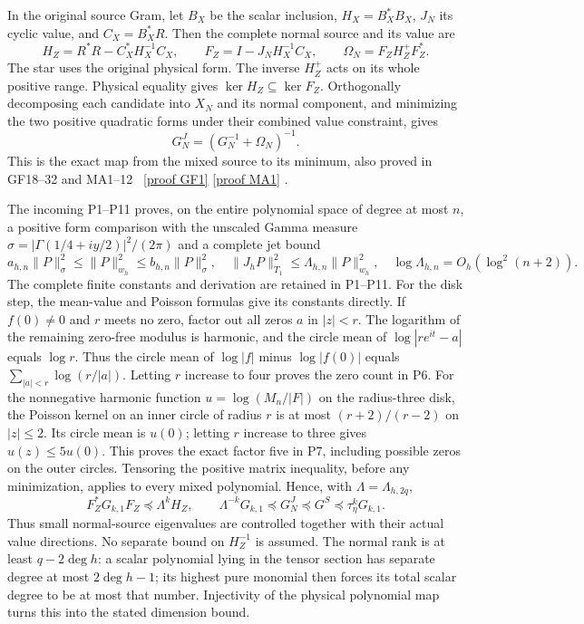 \documentclass[11pt]{article}
\begin{document}
In the original source Gram, let $B_X$ be the scalar inclusion,
$H_X=B_X^*B_X$, $J_N$ its cyclic value, and $C_X=B_X^*R$.
Then the complete normal source and its value are
\[
 H_Z=R^*R-C_X^*H_X^{-1}C_X,\qquad
 F_Z=I-J_NH_X^{-1}C_X,\qquad
 \Omega_N=F_ZH_Z^+F_Z^*.
 \tag{JM2}
\]
The star uses the original physical form. The inverse $H_Z^+$ acts on
its whole positive range. Physical equality gives
$\ker H_Z\subseteq\ker F_Z$. Orthogonally decomposing each candidate
into $X_N$ and its normal component, and minimizing the two positive
quadratic forms under their combined value constraint, gives
\[
 G_N^J=(G_N^{-1}+\Omega_N)^{-1}.\tag{JM3}
\]
This is the exact map from the mixed source to its minimum, also proved
in GF18--32 and MA1--12 \cite{GF,MA}%
~\href{https://github.com/KokunoYumeto/zeta-function-research-reader/blob/main/workbenches/splitzero-tandem/continuations/20260921-kernel-degree-steps/providers/OBSERVATION_COMPLETE_PROOFS.tex\#L1108}{[proof GF1]} \href{https://github.com/KokunoYumeto/zeta-function-research-reader/blob/main/workbenches/splitzero-tandem/continuations/20260921-kernel-degree-steps/providers/OBSERVATION_COMPLETE_PROOFS.tex\#L1893}{[proof MA1]}%
{}.

The incoming P1--P11 proves, on the entire polynomial space of degree
at most $n$, a positive form comparison with the unscaled Gamma
measure $\sigma=|\Gamma(1/4+iy/2)|^2/(2\pi)$ and a complete jet bound
\[
 a_{h,n}\|P\|_\sigma^2\le\|P\|_{w_h}^2\le b_{h,n}\|P\|_\sigma^2,
 \quad \|J_hP\|_{T_1}^2\le\Lambda_{h,n}\|P\|_{w_h}^2,
 \quad\log\Lambda_{h,n}=O_h(\log^2(n+2)).\tag{JM4}
\]
The complete finite constants and derivation are retained in P1--P11.
For the disk step, the mean-value and Poisson formulas
\cite{Complex} give its constants directly. If $f(0)\ne0$ and
$r$ meets no zero, factor out all zeros $a$ in $|z|<r$.
The logarithm of the remaining zero-free modulus is harmonic, and
the circle mean of $\log|re^{it}-a|$ equals $\log r$.
Thus the circle mean of $\log|f|$ minus $\log|f(0)|$ equals
$\sum_{|a|<r}\log(r/|a|)$. Letting $r$ increase to four proves
the zero count in P6. For the nonnegative harmonic function
$u=\log(M_n/|F|)$ on the radius-three disk, the Poisson kernel on
an inner circle of radius $r$ is at most $(r+2)/(r-2)$ on
$|z|\le2$. Its circle mean is $u(0)$; letting $r$ increase to
three gives $u(z)\le5u(0)$. This proves the exact factor five
in P7, including possible zeros on the outer circles.
Tensoring the positive matrix inequality, before any minimization,
applies to every mixed polynomial. Hence, with $\Lambda=\Lambda_{h,2q}$,
\[
 F_Z^*G_{k,1}F_Z\preceq\Lambda^kH_Z,\qquad
 \Lambda^{-k}G_{k,1}\preceq G_N^J
 \preceq G^S\preceq\tau_\eta^kG_{k,1}.\tag{JM5}
\]
Thus small normal-source eigenvalues are controlled together with
their actual value directions. No separate bound on $H_Z^{-1}$ is
assumed. The normal rank is at least $q-2\deg h$: a scalar polynomial
lying in the tensor section has separate degree at most $2\deg h-1$;
its highest pure monomial then forces its total scalar degree to be
at most that number. Injectivity of the physical polynomial map
turns this into the stated dimension bound.
\end{document}
